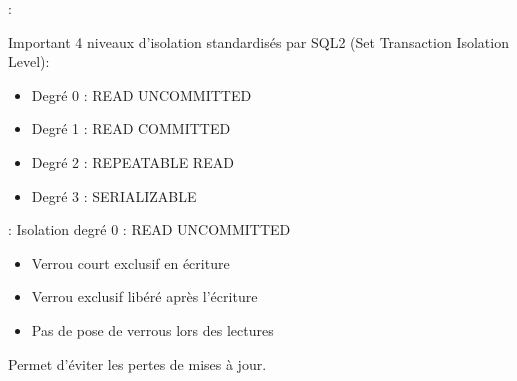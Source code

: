 \documentclass[10pt]{beamer}
\begin{document}
\begin{frame}{\secname : \subsecname}
    \begin{alertblock}{Important}
        4 niveaux d'isolation standardisés par SQL2 (Set Transaction Isolation Level):
        \begin{itemize}
            \item Degré 0 : READ UNCOMMITTED
            \item Degré 1 : READ COMMITTED
            \item Degré 2 : REPEATABLE READ
            \item Degré 3 : SERIALIZABLE
        \end{itemize}
    \end{alertblock}
\end{frame}

\begin{frame}{\secname : \subsecname}
    Isolation degré 0 : READ UNCOMMITTED
    \begin{itemize}
        \item Verrou court exclusif en écriture
        \item Verrou exclusif libéré après l'écriture
        \item Pas de pose de verrous lors des lectures
    \end{itemize}
    Permet d'éviter les pertes de mises à jour.
\end{frame}
\end{document}
